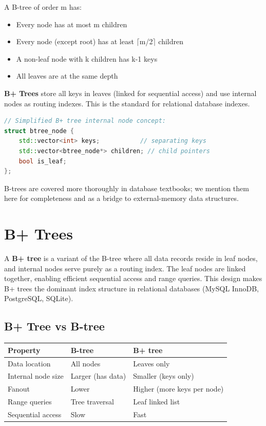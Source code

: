 A B-tree of order m has:
\begin{itemize}
\item Every node has at most m children
\item Every node (except root) has at least $\lceil $m/2$\rceil $ children
\item A non-leaf node with k children has k-1 keys
\item All leaves are at the same depth
\end{itemize}

\textbf{B+ Trees} store all keys in leaves (linked for sequential access) and use internal nodes as routing indexes. This is the standard for relational database indexes.

\begin{lstlisting}[language=C++]
// Simplified B+ tree internal node concept:
struct btree_node {
    std::vector<int> keys;           // separating keys
    std::vector<btree_node*> children; // child pointers
    bool is_leaf;
};
\end{lstlisting}

B-trees are covered more thoroughly in database textbooks; we mention them here for completeness and as a bridge to external-memory data structures.

\section{B+ Trees}

A \textbf{B+ tree} is a variant of the B-tree where all data records reside in leaf nodes, and internal nodes serve purely as a routing index. The leaf nodes are linked together, enabling efficient sequential access and range queries. This design makes B+ trees the dominant index structure in relational databases (MySQL InnoDB, PostgreSQL, SQLite).

\subsection{B+ Tree vs B-tree}

\begin{center}
\begin{tabular}{lll}
\toprule
Property & B-tree & B+ tree \\
\midrule
Data location & All nodes & Leaves only \\
Internal node size & Larger (has data) & Smaller (keys only) \\
Fanout & Lower & Higher (more keys per node) \\
Range queries & Tree traversal & Leaf linked list \\
Sequential access & Slow & Fast \\
\bottomrule
\end{tabular}
\end{center}

